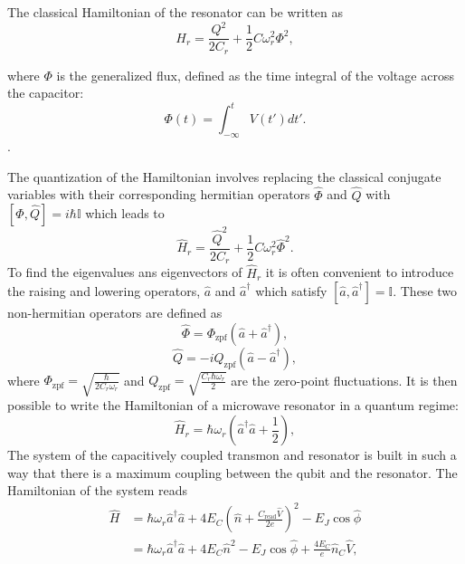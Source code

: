 The classical Hamiltonian of the resonator can be written as 
\begin{equation}\label{eq:classical_hamiltonian_resonator}
    H_r = \frac{Q^2}{2C_r} +  \frac{1}{2}C\omega_r^2\Phi^2,
\end{equation}

where $\Phi$ is the generalized flux, defined as the time integral of the voltage across the capacitor:
\begin{equation}\label{eq:generalized_flux}
    \Phi(t) = \int_{-\infty}^{t} V(t')dt' .
\end{equation}.

The quantization of the Hamiltonian involves replacing the classical conjugate variables with their corresponding hermitian operators $\hat{\Phi}$ and $\hat{Q}$ with $[\hat{\Phi},\hat{Q}]=i\hbar\mathbb{I}$ which leads to
\begin{equation}
    \hat{H}_r = \frac{\hat{Q}^2}{2C_r} +  \frac{1}{2}C\omega_r^2\hat{\Phi}^2.
\end{equation}
To find the eigenvalues ans eigenvectors of $\hat{H}_r$ it is often convenient to introduce the raising and lowering operators, $\hat{a}$ and $\hat{a}^\dagger$ which satisfy $[\hat{a},\hat{a}^\dagger]=\mathbb{I}$.
These two non-hermitian operators are defined as 
\begin{equation}\label{eq:Phi_operator}
    \hat{\Phi} =  \Phi_{\text{zpf}}(\hat{a} + \hat{a}^\dagger),
\end{equation}
\begin{equation}\label{eq:Q_operator}
    \hat{Q} = -iQ_{\text{zpf}}(\hat{a} - \hat{a}^\dagger),
\end{equation}
where $\Phi_{\text{zpf}} = \sqrt{\frac{\hbar}{2C_r\omega_r}}$ and $Q_{\text{zpf}} = \sqrt{\frac{C_r\hbar \omega_r}{2}}$ are the zero-point fluctuations.
It is then possible to write the Hamiltonian of a microwave resonator in a quantum regime:
\begin{equation}\label{eq:quant_resonator_hamiltonian}
    \hat{H}_r = \hbar\omega_r\left(\hat{a}^\dagger\hat{a} + \frac{1}{2}\right),
\end{equation}
The system of the capacitively coupled transmon and resonator is built in such a way that there is a maximum coupling between the qubit and the resonator.
The Hamiltonian of the system reads
\begin{align}
    \hat{H} &= \hbar \omega_r \hat{a}^\dagger \hat{a} + 4E_C (\hat{n} + \frac{C_{\text{read}}\hat{V}}{2e})^2- E_J \cos\hat{\phi}\\ 
    &= \hbar \omega_r \hat{a}^\dagger \hat{a} + 4E_C \hat{n}^2 - E_J \cos\hat{\phi} + \frac{4E_C}{e} \hat{n}_C \hat{V},
\end{align}
